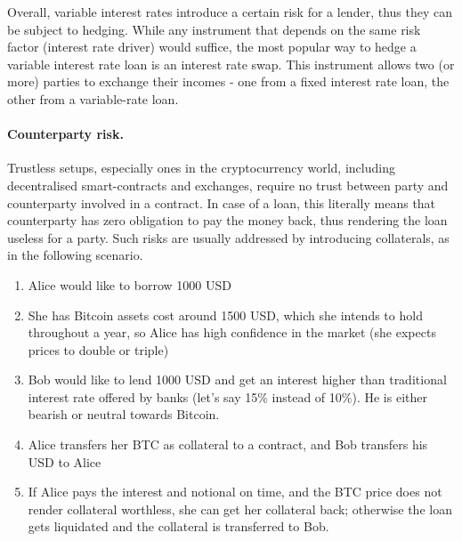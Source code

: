 \documentclass[runningheads]{llncs}
\begin{document}
Overall, variable interest rates introduce a certain risk for a lender,
thus they can be %
subject to hedging. While any instrument that depends
on the same risk factor (interest rate driver) would suffice, the
most popular way to hedge a variable interest rate loan is an interest
rate swap. This instrument allows two (or more) parties to exchange
their incomes - one from a fixed interest rate loan, the other from a variable-rate loan.

\paragraph*{Counterparty risk.}

Trustless setups, especially ones in the cryptocurrency world, including 
decentralised smart-contracts and exchanges, require no trust between
party and counterparty involved in a contract. In case of a loan,
this literally means that counterparty has zero obligation to pay
the money back, thus rendering the loan useless for a party. Such
risks are usually addressed by introducing collaterals, as in the following scenario. 
\begin{enumerate}
\item Alice would like to borrow 1000 USD 
\item She has Bitcoin assets cost around 1500 USD, which she intends to
hold throughout a year, so Alice has high confidence in the market
(she expects prices to double or triple) 
\item Bob would like to lend 1000 USD and get an interest higher than traditional
interest rate offered by banks (let's say 15\% instead of 10\%). He
is either bearish or neutral towards Bitcoin. 
\item Alice transfers her BTC as collateral to a contract, and Bob transfers
his USD to Alice 
\item If Alice pays the interest and notional on time, and the BTC price does not
render collateral worthless, she can get her collateral back; otherwise
the loan gets liquidated and the collateral is transferred to Bob. 
\end{enumerate}

\end{document}
